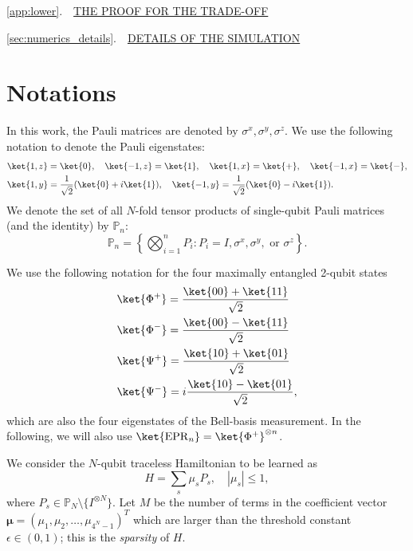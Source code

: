 \documentclass[twocolumn,superscriptaddress,aps,showpacs,amsmath,amstex,amssymb,citeautoscript,floatfix,pra,preprintnumbers]{revtex4-2}
\theoremstyle{plain}
\theoremstyle{plain}
\theoremstyle{plain}
\theoremstyle{plain}
\theoremstyle{plain}
\theoremstyle{plain}
\newcommand{\EPR}{\mathrm{EPR}}
\newcommand{\eqs}[1]{\begin{equation}\begin{split}#1\end{split}\end{equation}}
\begin{document}
\begin{appendix}
\noindent 
\ref{app:lower}.~~\hyperref[app:lower]{THE PROOF FOR THE TRADE-OFF} \dotfill\textbf{\pageref{app:lower}}
\medskip

\noindent 
\ref{sec:numerics_details}.~~\hyperref[sec:numerics_details]{DETAILS OF THE SIMULATION} \dotfill\textbf{\pageref{sec:numerics_details}}
\medskip





\section{Notations\label{app:notations}}
In this work, the Pauli matrices are denoted by $\sigma^{x},\sigma^{y},\sigma^{z}$.
We use the following notation to denote the Pauli eigenstates:
\begin{equation}
    \label{eq:pauli_lambdastates}
    \begin{aligned}
        &\ket{1,z} = \ket{0},\quad \ket{-1,z} = \ket{1},\quad \ket{1,x} = \ket{+},\quad \ket{-1,x} = \ket{-},\\
        &\ket{1,y} = \frac{1}{\sqrt{2}}(\ket{0}+i\ket{1}),\quad \ket{-1,y} = \frac{1}{\sqrt{2}}(\ket{0}-i\ket{1}).
    \end{aligned}
\end{equation}
We denote the set of all $N$-fold tensor products of single-qubit Pauli matrices (and the identity) by $\mathbb{P}_n$:
\begin{equation}
    \label{eq:defn_pauli_matrices}
    \mathbb{P}_n = \left\{\bigotimes_{i=1}^n P_i:P_i=I,\sigma^x,\sigma^y,\text{ or }\sigma^z\right\}.
\end{equation}

We use the following notation for the four maximally entangled 2-qubit states
\eqs{
&\ket{\Phi^{+}} = \dfrac{\ket{00}+\ket{11}}{\sqrt{2}}\\
&\ket{\Phi^{-}}=\dfrac{\ket{00}-\ket{11}}{\sqrt{2}}\\
&\ket{\Psi^{+}}=\dfrac{\ket{10}+\ket{01}}{\sqrt{2}}\\
&\ket{\Psi^{-}}=i\dfrac{\ket{10}-\ket{01}}{\sqrt{2}},
}
which are also the four eigenstates of the Bell-basis measurement. In the following, we will also use $\ket{\EPR_n}=\ket{\Phi^{+}}^{\otimes n}$.

We consider the $N$-qubit traceless Hamiltonian to be learned as
\begin{equation}
    H = \sum_s\mu_sP_s,\quad |\mu_s|\leq 1,
\end{equation}
where $P_s\in \mathbb{P}_N\setminus\{I^{\otimes N}\}$. 
Let $M$ be the number of terms in the coefficient vector $\boldsymbol{\mu}=(\mu_1,\mu_2,\ldots,\mu_{4^N-1})^T$ which are larger than the threshold constant $\epsilon\in(0,1)$; this is the \emph{sparsity} of $H$. 


\end{appendix}
\end{document}
